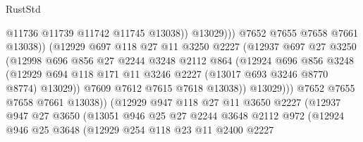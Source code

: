 \begin{lexlean}{RustStd}
\begin{coremodule}
                                    @11736
                                    @11739
                                    @11742
                                    @11745
                                    @13038))
                                @13029)))
                          @7652
                          @7655
                          @7658
                          @7661
                          @13038))
                      (@12929
                        @697
                        @118
                        @27
                        @11
                        @3250
                        @2227
                        (@12937
                          @697
                          @27
                          @3250
                          (@12998
                            @696
                            @856
                            @27
                            @2244
                            @3248
                            @2112
                            @864
                            (@12924
                              @696
                              @856
                              @3248
                              (@12929
                                @694
                                @118
                                @171
                                @11
                                @3246
                                @2227
                                (@13017 @693 @3246 @8770 @8774)
                                @13029))
                            @7609
                            @7612
                            @7615
                            @7618
                            @13038))
                        @13029)))
                  @7652
                  @7655
                  @7658
                  @7661
                  @13038))
              (@12929
                @947
                @118
                @27
                @11
                @3650
                @2227
                (@12937
                  @947
                  @27
                  @3650
                  (@13051
                    @946
                    @25
                    @27
                    @2244
                    @3648
                    @2112
                    @972
                    (@12924
                      @946
                      @25
                      @3648
                      (@12929
                        @254
                        @118
                        @23
                        @11
                        @2400
                        @2227

\end{coremodule}
\end{lexlean}
